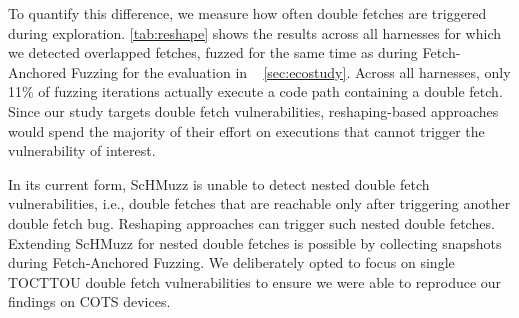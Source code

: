 \documentclass[conference]{IEEEtran} %
\newcommand{\sysname}{ScHMuzz\xspace}
\newcommand{\stagetwo}{Fetch-Anchored Fuzzing\xspace} %
\newcommand{\numexecsdfperc}{11\%\xspace}
\providecommand{\DIFaddtex}[1]{{\protect\color{blue} \sf #1}} %
\providecommand{\DIFdeltex}[1]{{\protect\color{red} \scriptsize #1}} %
\providecommand{\DIFaddbegin}{} %
\providecommand{\DIFaddend}{} %
\providecommand{\DIFdelbegin}{} %
\providecommand{\DIFdelend}{} %
\providecommand{\DIFadd}[1]{\texorpdfstring{\DIFaddtex{#1}}{#1}} %
\providecommand{\DIFdel}[1]{\texorpdfstring{\DIFdeltex{#1}}{}} %
\begin{document}
To quantify this difference, we measure 
how often double fetches are triggered during exploration. \autoref{tab:reshape} shows the results 
across all harnesses for which we detected overlapped fetches, fuzzed for the same time as during 
\stagetwo for the evaluation in ~\DIFdelbegin %
\DIFdelend \DIFaddbegin \autoref{sec:ecostudy}\DIFaddend . Across all harnesses, only 
\numexecsdfperc{} of fuzzing iterations actually execute a code path containing a double 
fetch. Since our study targets double fetch vulnerabilities, reshaping-based 
approaches would spend the majority of their effort on executions that cannot trigger the 
vulnerability of interest. 

In its current form, \sysname is unable to detect nested double fetch vulnerabilities, i.e., double fetches 
that are reachable only after triggering another double fetch bug. Reshaping approaches 
can trigger such nested double fetches. Extending \sysname for nested double fetches is possible 
by collecting snapshots during \stagetwo. We deliberately opted to focus on single \DIFdelbegin \DIFdel{TOCTTOU 
}\DIFdelend \DIFaddbegin \DIFadd{double fetch 
}\DIFaddend vulnerabilities to ensure we were able to reproduce our findings on COTS devices. 
\end{document}
